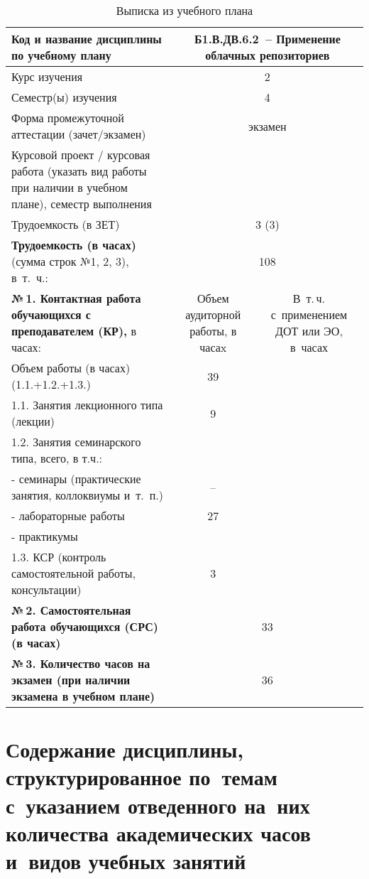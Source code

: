 \documentclass[a4paper,12pt]{article}
\begin{document}
\begin{table}[H]
\caption{Выписка из учебного плана} 
\begin{tabular}{|p{9cm}|c|c|}
\hline
Код и название дисциплины по учебному плану & \multicolumn{2}{p{6cm}|}{Б1.В.ДВ.6.2\ -- Применение облачных репозиториев }\\
\hline
Курс изучения &\multicolumn{2}{c|}{ 2 }\\
\hline
Семестр(ы) изучения &\multicolumn{2}{c|}{ 4 }\\
\hline
Форма промежуточной аттестации (зачет/экзамен) &\multicolumn{2}{c|}{ экзамен }\\
\hline
Курсовой проект / курсовая работа (указать вид работы при наличии в учебном плане), семестр выполнения &\multicolumn{2}{c|}{ }\\
\hline
Трудоемкость (в ЗЕТ) &\multicolumn{2}{c|}{ 3 (3) }\\
\hline
{\bf Трудоемкость (в часах)} (сумма строк №1, 2, 3), в~т.~ч.:& \multicolumn{2}{c|}{108}\\
\hline
\textbf{№\,1. Контактная работа обучающихся с преподавателем (КР),} в часах:
& \multicolumn{1}{p{3cm}|}{\centering Объем аудиторной работы, в часаx}
& \multicolumn{1}{p{3cm}|}{\centering\arraybackslash В~т.\,ч. с~применением ДОТ или ЭО, в~часах}\\
\hline  
Объем работы (в часах) (1.1.+1.2.+1.3.)& 39 & \\
\hline
1.1. Занятия лекционного типа (лекции) & 9 & \\
\hline
1.2. Занятия семинарского типа, всего, в т.ч.: & & \\
\hline
- семинары (практические занятия, коллоквиумы и~т.~п.)  & – & \\
\hline
- лабораторные работы& 27 & \\
\hline
- практикумы & & \\
\hline
1.3. КСР (контроль самостоятельной работы, консультации)& 3 & \\
\hline
{\bf №\,2. Самостоятельная работа обучающихся (СРС) (в часах)}& \multicolumn{2}{c|}{33}\\
\hline
{\bf №\,3. Количество часов на экзамен (при наличии экзамена в учебном плане)}& \multicolumn{2}{c|}{36}\\
\hline
\end{tabular}
\end{table}



\newpage
\section{Содержание дисциплины, структурированное по~темам с~указанием отведенного на~них количества академических часов и~видов учебных занятий}
\end{document}
